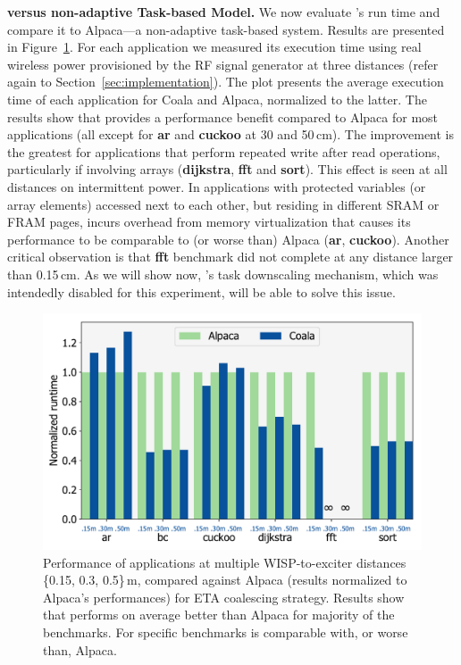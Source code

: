 \textbf{\sys versus non-adaptive Task-based Model.} We now evaluate \sys's run time and compare it to Alpaca---a non-adaptive task-based system. Results are presented in Figure~\ref{fig:runtime}. For each application we measured its execution time using real wireless power provisioned by the RF signal generator at three distances (refer again to Section~\ref{sec:implementation}). The plot presents the average execution time of each application for Coala and Alpaca, normalized to the latter. The results show that \sys provides a performance benefit compared to Alpaca for most applications (all except for \textbf{ar} and \textbf{cuckoo} at 30 and 50\,cm). The improvement is the greatest for applications that perform repeated write after read operations, particularly if involving arrays (\textbf{dijkstra}, \textbf{fft} and \textbf{sort}). This effect is seen at all distances on intermittent power. In applications with protected variables (or array elements) accessed next to each other, but residing in different SRAM or FRAM pages, \sys incurs overhead from memory virtualization that causes its performance to be comparable to (or worse than) Alpaca (\textbf{ar}, \textbf{cuckoo}). Another critical observation is that \textbf{fft} benchmark did not complete at any distance larger than 0.15\,cm. As we will show now, \sys's task downscaling mechanism, which was intendedly disabled for this experiment, will be able to solve this issue.

\begin{figure}
	\centering
	\includegraphics[width=0.5\columnwidth]{figures/coala_alpaca_gcc}
	\caption{Performance of \sys applications at multiple WISP-to-exciter distances \{0.15, 0.3, 0.5\}\,m, compared against Alpaca (results normalized to Alpaca's performances) for ETA coalescing strategy. Results show that \sys performs on average better than Alpaca for majority of the benchmarks. For specific benchmarks \sys is comparable with, or worse than, Alpaca.}
	\label{fig:runtime}
\end{figure}
	
